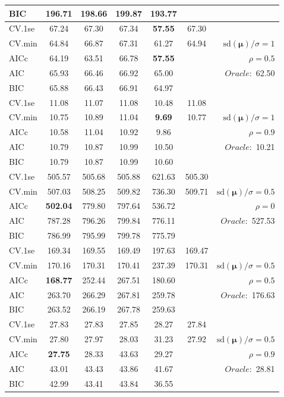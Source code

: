 \begin{table}
\begin{center}
\begin{tabular}{l*{5}{c}|r}
BIC & 196.71 & 198.66 & 199.87 & 193.77 & &  \\
 \hline 
CV.1se & 67.24 & 67.30 & 67.34 & {\bf 57.55} & 67.30 & \\
CV.min & 64.84 & 66.87 & 67.31 & 61.27 & 64.94 &  $\mathrm{sd}(\mathbf{\mu})/\sigma=1$ \\
AICc & 64.19 & 63.51 & 66.78 & {\bf 57.55} & & $\rho=0.5$ \\
AIC & 65.93 & 66.46 & 66.92 & 65.00 & &  \multirow{2}{*}{$Oracle: $ 62.50} \\
BIC & 65.88 & 66.43 & 66.91 & 64.97 & &  \\
 \hline 
CV.1se & 11.08 & 11.07 & 11.08 & 10.48 & 11.08 & \\
CV.min & 10.75 & 10.89 & 11.04 & {\bf 9.69} & 10.77 &  $\mathrm{sd}(\mathbf{\mu})/\sigma=1$ \\
AICc & 10.58 & 11.04 & 10.92 & 9.86 & & $\rho=0.9$ \\
AIC & 10.79 & 10.87 & 10.99 & 10.50 & &  \multirow{2}{*}{$Oracle: $ 10.21} \\
BIC & 10.79 & 10.87 & 10.99 & 10.60 & &  \\
 \hline 
CV.1se & 505.57 & 505.68 & 505.88 & 621.63 & 505.30 & \\
CV.min & 507.03 & 508.25 & 509.82 & 736.30 & 509.71 &  $\mathrm{sd}(\mathbf{\mu})/\sigma=0.5$ \\
AICc & {\bf 502.04} & 779.80 & 797.64 & 536.72 & & $\rho=0$ \\
AIC & 787.28 & 796.26 & 799.84 & 776.11 & &  \multirow{2}{*}{$Oracle: $ 527.53} \\
BIC & 786.99 & 795.99 & 799.78 & 775.79 & &  \\
 \hline 
CV.1se & 169.34 & 169.55 & 169.49 & 197.63 & 169.47 & \\
CV.min & 170.16 & 170.31 & 170.41 & 237.39 & 170.31 &  $\mathrm{sd}(\mathbf{\mu})/\sigma=0.5$ \\
AICc & {\bf 168.77} & 252.44 & 267.51 & 180.60 & & $\rho=0.5$ \\
AIC & 263.70 & 266.29 & 267.81 & 259.78 & &  \multirow{2}{*}{$Oracle: $ 176.63} \\
BIC & 263.52 & 266.19 & 267.78 & 259.63 & &  \\
 \hline 
CV.1se & 27.83 & 27.83 & 27.85 & 28.27 & 27.84 & \\
CV.min & 27.80 & 27.97 & 28.03 & 31.23 & 27.92 &  $\mathrm{sd}(\mathbf{\mu})/\sigma=0.5$ \\
AICc & {\bf 27.75} & 28.33 & 43.63 & 29.27 & & $\rho=0.9$ \\
AIC & 43.01 & 43.43 & 43.86 & 41.67 & &  \multirow{2}{*}{$Oracle: $ 28.81} \\
BIC & 42.99 & 43.41 & 43.84 & 36.55 & &  \\
 \hline 
\end{tabular}
\end{center}
\vspace{-1cm}
\end{table}




